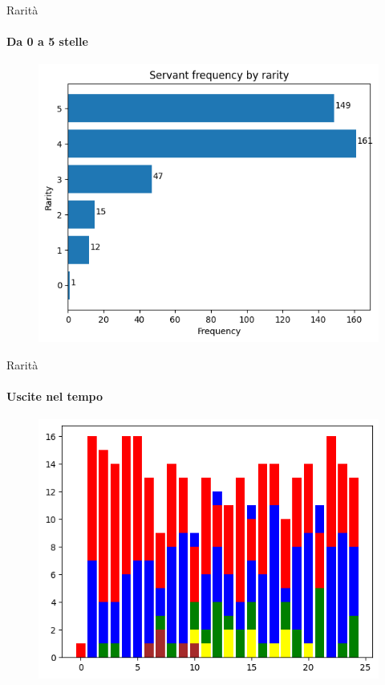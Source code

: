 \documentclass{beamer}
\begin{document}
\begin{darkframes}
  \begin{frame}{Rarità}
    \framesubtitle{Da 0 a 5 stelle}
    \begin{figure}
      \centering
      \includegraphics[scale=0.60]{./images/frequency_by_rarity.png}
    \end{figure}
  \end{frame}

  \begin{frame}{Rarità}
    \framesubtitle{Uscite nel tempo}
    \begin{figure}
      \centering
      \includegraphics[scale=0.65]{./images/rarity_per_year_bar.png}
    \end{figure}
  \end{frame}


\end{darkframes}
\end{document}
